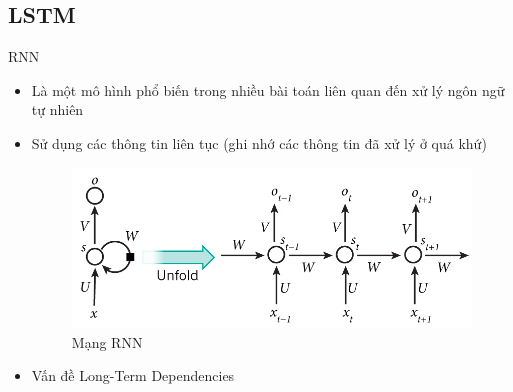 \documentclass[compress]{beamer}
\begin{document}
\subsection{LSTM}
\begin{frame}{RNN}
\begin{itemize}
\item Là một mô hình phổ biến trong nhiều bài toán liên quan đến xử lý ngôn ngữ tự nhiên
\item Sử dụng các thông tin liên tục (ghi nhớ các thông tin đã xử lý ở quá khứ) 
\begin{figure}[H]
\centering
\includegraphics[scale=0.3]{rnn.jpg}
\caption{Mạng RNN}
\end{figure}
 \item Vấn đề Long-Term Dependencies
\end{itemize}
\end{frame}
\end{document}
